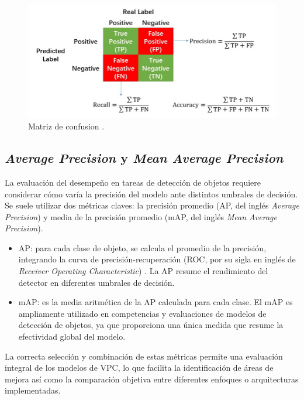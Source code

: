 \begin{figure}[htpb]
	\centering
	\includegraphics[scale=0.5]{./Figures/precision-recall-accuracy.png}
	\caption{Matriz de confusion \protect\footnotemark.}
	\label{fig:presicion-recall-accuracy}
\end{figure}


\subsection{\textit{Average Precision} y \textit{Mean Average Precision}}

La evaluación del desempeño en tareas de detección de objetos requiere considerar cómo varía la precisión del modelo ante distintos umbrales de decisión. Se suele utilizar dos métricas claves: la precisión promedio (AP, del inglés \textit{Average Precision}) y media de la precisión promedio (mAP, del inglés \textit{Mean Average Precision}).

\begin{itemize}
	\item AP: para cada clase de objeto, se calcula el promedio de la precisión, integrando la curva de precisión-recuperación (ROC, por su sigla en inglés de \textit{Receiver Operating Characteristic}) \citep{wikipedia_curva_2025}. La AP resume el rendimiento del detector en diferentes umbrales de decisión.
	\item mAP: es la media aritmética de la AP calculada para cada clase. El mAP es ampliamente utilizado en competencias y evaluaciones de modelos de detección de objetos, ya que proporciona una única medida que resume la efectividad global del modelo.
\end{itemize}

La correcta selección y combinación de estas métricas permite una evaluación integral de los modelos de VPC, lo que facilita la identificación de áreas de mejora así como la comparación objetiva entre diferentes enfoques o arquitecturas implementadas.